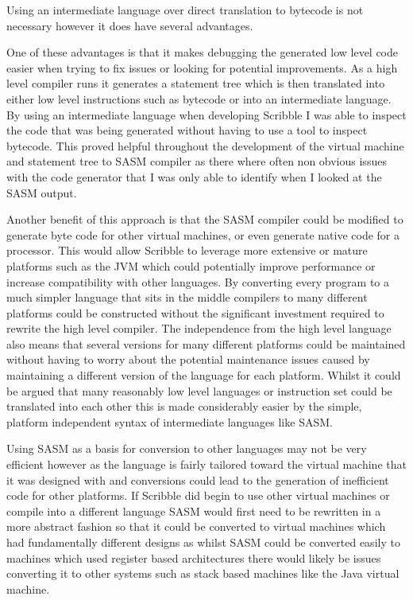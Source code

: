 \documentclass[]{final_report}
\begin{document}
Using an intermediate language over direct translation to bytecode is not necessary however it does have several advantages.

One of these advantages is that it makes debugging the generated low level code easier when trying to fix issues or looking for potential improvements. As a high level compiler runs it generates a statement tree which is then translated into either low level instructions such as bytecode or into an intermediate language. By using an intermediate language when developing Scribble I was able to inspect the code that was being generated without having to use a tool to inspect bytecode. This proved helpful throughout the development of the virtual machine and statement tree to SASM compiler as there where often non obvious issues with the code generator that I was only able to identify when I looked at the SASM output.

Another benefit of this approach is that the SASM compiler could be modified to generate byte code for other virtual machines, or even generate native code for a processor. This would allow Scribble to leverage more extensive or mature platforms such as the JVM which could potentially improve performance or increase compatibility with other languages. By converting every program to a much simpler language that sits in the middle compilers to many different platforms could be constructed without the significant investment required to rewrite the high level compiler. The independence from the high level language also means that several versions for many different platforms could be maintained without having to worry about the potential maintenance issues caused by maintaining a different version of the language for each platform. Whilst it could be argued that many reasonably low level languages or instruction set could be translated into each other this is made considerably easier by the simple, platform independent syntax of intermediate languages like SASM.

Using SASM as a basis for conversion to other languages may not be very efficient however as the language is fairly tailored toward the virtual machine that it was designed with and conversions could lead to the generation of inefficient code for other platforms. If Scribble did begin to use other virtual machines or compile into a different language SASM would first need to be rewritten in a more abstract fashion so that it could be converted to virtual machines which had fundamentally different designs as whilst SASM could be converted easily to machines which used register based architectures there would likely be issues converting it to other systems such as stack based machines like the Java virtual machine.
\end{document}
